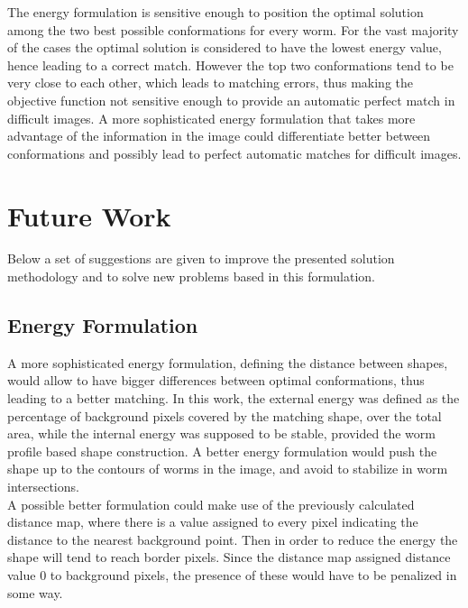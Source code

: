 The energy formulation is sensitive enough to position the optimal solution
among the two best possible conformations for every worm. For the vast majority
of the cases the optimal solution is considered to have the lowest 
energy value, hence
leading to a correct match. However the top two conformations tend to be
very close to each other, which leads to matching errors, thus making
the objective function not sensitive enough to provide an automatic perfect
match in difficult images. A more sophisticated energy formulation that
takes more advantage of the information in the image could
differentiate better between conformations and possibly
lead to perfect automatic matches for difficult images.


\section{Future Work}

Below a set of suggestions are given to improve the presented solution
methodology and to solve new problems based in this formulation.


\subsection*{Energy Formulation}
A more sophisticated energy formulation, defining the distance between 
shapes, would allow to have bigger differences between optimal conformations,
thus leading to a better matching. In this work, the external energy was
defined as the percentage of background pixels covered by the matching shape,
over the total area, while the internal energy was supposed to be stable,
provided the worm profile based shape construction. 
A better energy formulation would push the shape up to the contours of
worms in the image, and avoid to stabilize in worm intersections.\\
A possible better formulation could make use of the previously calculated
distance map, where there is a value assigned to every pixel
indicating the distance to the nearest background point. 
Then in order to reduce the energy the shape will tend to reach border pixels.
Since the distance map assigned distance value $0$ to background pixels, the 
presence of these would have to be penalized in some way.


